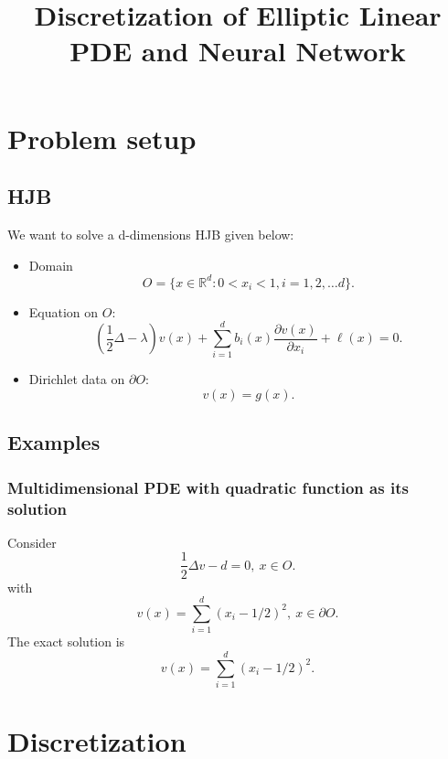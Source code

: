 \documentclass[11pt]{amsart}
\title{Discretization of Elliptic Linear PDE and Neural Network}
\begin{document}
\maketitle

\section{Problem setup}
\subsection{HJB}
We want to solve a d-dimensions HJB given below:
\begin{itemize}
 \item Domain 
 $$O = \{x\in \mathbb R^{d}: 0<x_{i}< 1, i =1,2, \ldots d\}.$$
 \item Equation on $O$: 
 $$(\frac 1 2 \Delta -  \lambda) v(x) + 
 \sum_{i=1}^db_i(x)  \frac{\partial v(x)}{\partial x_i}  
  + \ell(x) = 0.$$
 \item Dirichlet data on $\partial O$:
 $$v(x) = g(x).$$
\end{itemize}

\subsection{Examples} 

\subsubsection{Multidimensional PDE with quadratic function as its solution}
Consider
$$
 \frac 1 2 \Delta v - d = 0, \ x\in O.
$$
with
$$
v(x) = \sum_{i=1}^{d} (x_{i} - 1/2)^{2}, \ x\in \partial O.
$$
The exact solution is 
$$
v(x) = \sum_{i=1}^{d} (x_{i} - 1/2)^{2}.
$$

\section{Discretization}
\end{document}
